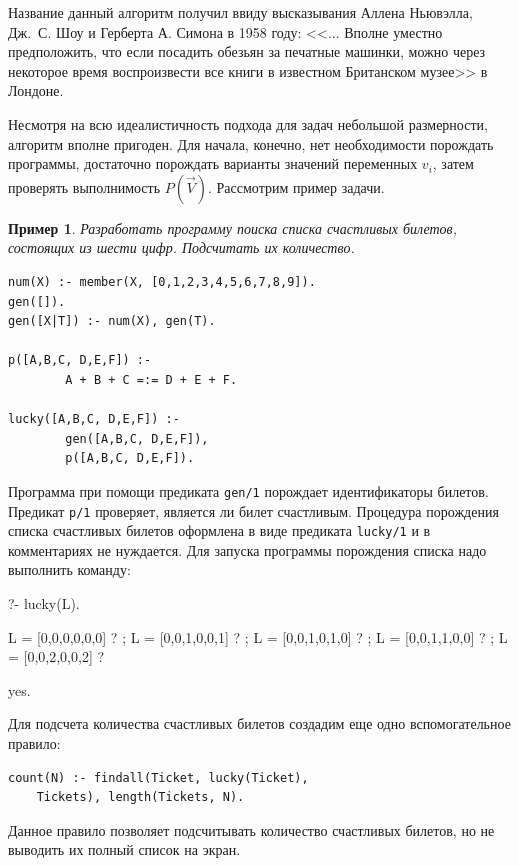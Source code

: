 \documentclass[a4paper,14pt, openany, twoside, draft]{extbook} %
\newtheorem{example}{Пример}[chapter]
\begin{document}
Название данный алгоритм получил ввиду высказывания Аллена Ньювэлла, Дж.~С. Шоу и Герберта А. Симона в 1958 году: <<... Вполне уместно предположить, что если посадить обезьян за печатные машинки, можно через некоторое время воспроизвести все книги в известном Британском музее>> в Лондоне.

Несмотря на всю идеалистичность подхода для задач небольшой размерности, алгоритм вполне пригоден. Для начала, конечно, нет необходимости порождать программы, достаточно порождать варианты значений переменных $v_i$, затем проверять выполнимость $P(\vec{V})$. Рассмотрим пример задачи.

\begin{example}
Разработать программу поиска списка счастливых билетов, состоящих из шести цифр. Подсчитать их количество.
\end{example}

\begin{verbatim}
num(X) :- member(X, [0,1,2,3,4,5,6,7,8,9]).
gen([]).
gen([X|T]) :- num(X), gen(T).

p([A,B,C, D,E,F]) :-
        A + B + C =:= D + E + F.

lucky([A,B,C, D,E,F]) :-
        gen([A,B,C, D,E,F]),
        p([A,B,C, D,E,F]).
\end{verbatim}

Программа при помощи предиката \texttt{gen/1} порождает идентификаторы билетов. Предикат \texttt{p/1} проверяет, является ли билет счастливым. Процедура порождения списка счастливых билетов оформлена в виде предиката \texttt{lucky/1} и в комментариях не нуждается. Для запуска программы порождения списка надо выполнить команду:

\begin{proexp}
?- lucky(L).

L = [0,0,0,0,0,0] ? ;
L = [0,0,1,0,0,1] ? ;
L = [0,0,1,0,1,0] ? ;
L = [0,0,1,1,0,0] ? ;
L = [0,0,2,0,0,2] ?

yes.
\end{proexp}

\noindent{}Для подсчета количества счастливых билетов создадим еще одно вспомогательное правило:

\begin{verbatim}
count(N) :- findall(Ticket, lucky(Ticket),
    Tickets), length(Tickets, N).
\end{verbatim}

\noindent{}Данное правило позволяет подсчитывать количество счастливых билетов, но не выводить их полный список на экран.
\end{document}
